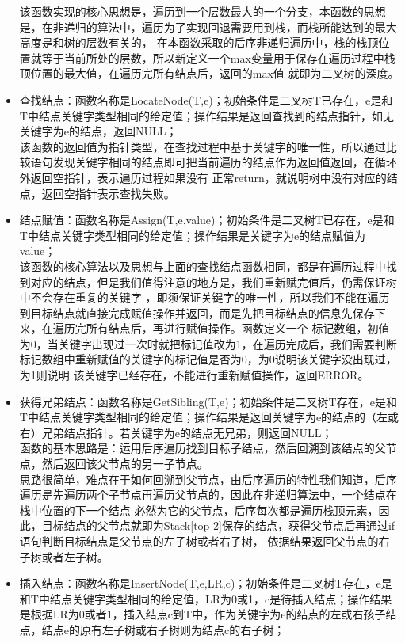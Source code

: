 \documentclass[supercite]{Experimental_Report}
\theoremstyle{definition}
\begin{document}
\begin{itemize}
	      该函数实现的核心思想是，遍历到一个层数最大的一个分支，本函数的思想是，在非递归的算法中，遍历为了实现回退需要用到栈，而栈所能达到的最大高度是和树的层数有关的，
	      在本函数采取的后序非递归遍历中，栈的栈顶位置就等于当前所处的层数，所以新定义一个max变量用于保存在遍历过程中栈顶位置的最大值，在遍历完所有结点后，返回的max值
	      就即为二叉树的深度。
	\item 查找结点：函数名称是LocateNode(T,e)；初始条件是二叉树T已存在，e是和T中结点关键字类型相同的给定值；操作结果是返回查找到的结点指针，如无关键字为e的结点，返回NULL；\\
	      该函数的返回值为指针类型，在查找过程中基于关键字的唯一性，所以通过比较语句发现关键字相同的结点即可把当前遍历的结点作为返回值返回，在循环外返回空指针，表示遍历过程如果没有
	      正常return，就说明树中没有对应的结点，返回空指针表示查找失败。
	\item 结点赋值：函数名称是Assign(T,e,value)；初始条件是二叉树T已存在，e是和T中结点关键字类型相同的给定值；操作结果是关键字为e的结点赋值为value；\\
	      该函数的核心算法以及思想与上面的查找结点函数相同，都是在遍历过程中找到对应的结点，但是我们值得注意的地方是，我们重新赋完值后，仍需保证树中不会存在重复的关键字
	      ，即须保证关键字的唯一性，所以我们不能在遍历到目标结点就直接完成赋值操作并返回，而是先把目标结点的信息先保存下来，在遍历完所有结点后，再进行赋值操作。函数定义一个
	      标记数组，初值为0，当关键字出现过一次时就把标记值改为1，在遍历完成后，我们需要判断标记数组中重新赋值的关键字的标记值是否为0，为0说明该关键字没出现过，为1则说明
	      该关键字已经存在，不能进行重新赋值操作，返回ERROR。
	\item 获得兄弟结点：函数名称是GetSibling(T,e)；初始条件是二叉树T存在，e是和T中结点关键字类型相同的给定值；操作结果是返回关键字为e的结点的（左或右）兄弟结点指针。若关键字为e的结点无兄弟，则返回NULL；\\
	      函数的基本思路是：运用后序遍历找到目标子结点，然后回溯到该结点的父节点，然后返回该父节点的另一子节点。\\
	      思路很简单，难点在于如何回溯到父节点，由后序遍历的特性我们知道，后序遍历是先遍历两个子节点再遍历父节点的，因此在非递归算法中，一个结点在栈中位置的下一个结点
	      必然为它的父节点，后序每次都是遍历栈顶元素，因此，目标结点的父节点就即为Stack[top-2]保存的结点，获得父节点后再通过if语句判断目标结点是父节点的左子树或者右子树，
	      依据结果返回父节点的右子树或者左子树。
	\item 插入结点：函数名称是InsertNode(T,e,LR,c)；初始条件是二叉树T存在，e是和T中结点关键字类型相同的给定值，LR为0或1，c是待插入结点；操作结果是根据LR为0或者1，插入结点c到T中，作为关键字为e的结点的左或右孩子结点，结点e的原有左子树或右子树则为结点c的右子树；

\end{itemize}
\end{document}
